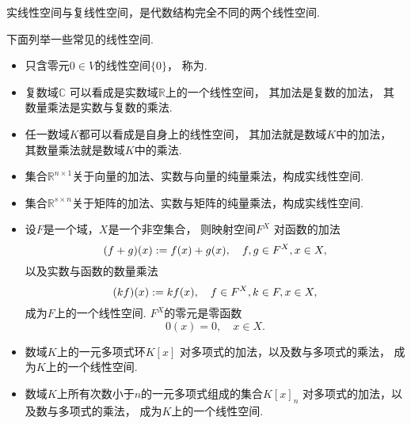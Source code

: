 实线性空间与复线性空间，是代数结构完全不同的两个线性空间.

\begin{example}
下面列举一些常见的线性空间.
\begin{itemize}
	\item 只含零元\(0 \in V\)的线性空间\(\{0\}\)，
	称为.

	\item 复数域\(\mathbb{C}\)
	可以看成是实数域\(\mathbb{R}\)上的一个线性空间，
	其加法是复数的加法，
	其数量乘法是实数与复数的乘法.

	\item 任一数域\(K\)都可以看成是自身上的线性空间，
	其加法就是数域\(K\)中的加法，
	其数量乘法就是数域\(K\)中的乘法.

	\item 集合\(\mathbb{R}^{n \times 1}\)关于向量的加法、实数与向量的纯量乘法，构成实线性空间.

	\item 集合\(\mathbb{R}^{s \times n}\)关于矩阵的加法、实数与矩阵的纯量乘法，构成实线性空间.

	\item 设\(F\)是一个域，\(X\)是一个非空集合，
	则映射空间\(F^X\)
	对函数的加法\begin{equation*}
		(f+g)(x) := f(x) + g(x),
		\quad f,g \in F^X, x \in X,
	\end{equation*}
	以及实数与函数的数量乘法\begin{equation*}
		(k f)(x) := k f(x),
		\quad f \in F^X, k \in F, x \in X,
	\end{equation*}
	成为\(F\)上的一个线性空间.
	\(F^X\)的零元是零函数\begin{equation*}
		0(x) = 0,
		\quad x \in X.
	\end{equation*}

	\item 数域\(K\)上的一元多项式环\(K[x]\)
	对多项式的加法，以及数与多项式的乘法，
	成为\(K\)上的一个线性空间.

	\item 数域\(K\)上所有次数小于\(n\)的一元多项式组成的集合\(K[x]_n\)
	对多项式的加法，以及数与多项式的乘法，
	成为\(K\)上的一个线性空间.
\end{itemize}
\end{example}

